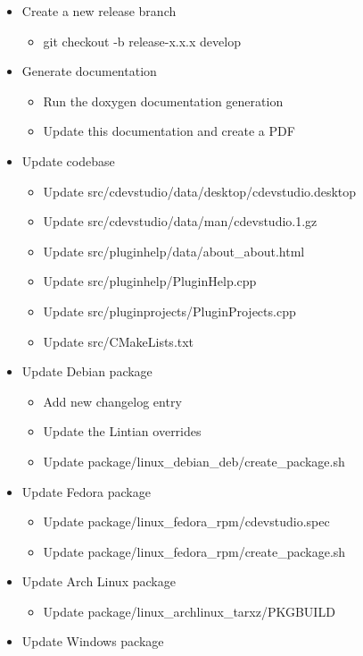 \documentclass{article}
\begin{document}
\begin{itemize}
	\item Create a new release branch
	\begin{itemize}
		\item git checkout -b release-x.x.x develop
	\end{itemize}
	\item Generate documentation
	\begin{itemize}
		\item Run the doxygen documentation generation
		\item Update this documentation and create a PDF
	\end{itemize}
	\item Update codebase
	\begin{itemize}
		\item Update src/cdevstudio/data/desktop/cdevstudio.desktop
		\item Update src/cdevstudio/data/man/cdevstudio.1.gz
		\item Update src/pluginhelp/data/about_about.html
		\item Update src/pluginhelp/PluginHelp.cpp
		\item Update src/pluginprojects/PluginProjects.cpp
		\item Update src/CMakeLists.txt
	\end{itemize}
	\item Update Debian package
	\begin{itemize}
		\item Add new changelog entry
		\item Update the Lintian overrides
		\item Update package/linux_debian_deb/create_package.sh
	\end{itemize}
	\item Update Fedora package
	\begin{itemize}
		\item Update package/linux_fedora_rpm/cdevstudio.spec
		\item Update package/linux_fedora_rpm/create_package.sh
	\end{itemize}
	\item Update Arch Linux package
	\begin{itemize}
		\item Update package/linux_archlinux_tarxz/PKGBUILD
	\end{itemize}
	\item Update Windows package
	\begin{itemize}

\end{itemize}
\end{itemize}
\end{document}
